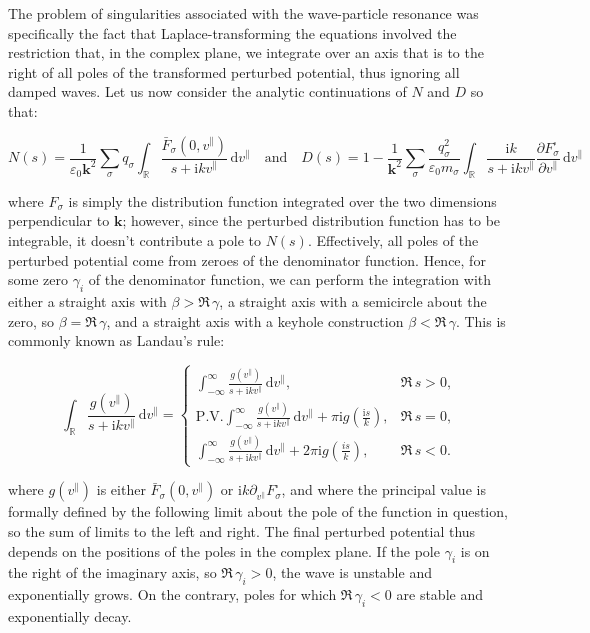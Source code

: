 \quad The problem of singularities associated with the wave-particle resonance was specifically the fact that Laplace-transforming the equations involved the restriction that, in the complex plane, we integrate over an axis that is to the right of all poles of the transformed perturbed potential, thus ignoring all damped waves. Let us now consider the analytic continuations of $N$ and $D$ so that:

\begin{equation}
    N(s)=\frac{1}{\varepsilon_0\mathbf{k}^2}\sum_\sigma q_\sigma\int_{\mathbb{R}}\frac{\bar{F}_\sigma(0,v^\parallel)}{s+\mathrm{i}kv^\parallel}\,\mathrm{d}v^\parallel\quad\text{and}\quad D(s)=1-\frac{1}{\mathbf{k}^2}\sum_\sigma\frac{q_\sigma^2}{\varepsilon_0m_\sigma}\int_{\mathbb{R}}\frac{\mathrm{i}k}{s+\mathrm{i}kv^\parallel}\frac{\partial F_\sigma^\square}{\partial v^\parallel}\,\mathrm{d}v^\parallel
\end{equation}

where $F_\sigma$ is simply the distribution function integrated over the two dimensions perpendicular to $\mathbf{k}$; however, since the perturbed distribution function has to be integrable, it doesn't contribute a pole to $N(s)$. Effectively, all poles of the perturbed potential come from zeroes of the denominator function. Hence, for some zero $\gamma_i$ of the denominator function, we can perform the integration with either a straight axis with $\beta>\Re\,\gamma$, a straight axis with a semicircle about the zero, so $\beta=\Re\,\gamma$, and a straight axis with a keyhole construction $\beta<\Re\,\gamma$. This is commonly known as Landau's rule:

\begin{equation}
    \int_\mathbb{R}\frac{g(v^\parallel)}{s+\mathrm{i}kv^\parallel}\,\mathrm{d}v^\parallel=\begin{cases}\int_{-\infty}^\infty\frac{g(v^\parallel)}{s+\mathrm{i}kv^\parallel}\,\mathrm{d}v^\parallel,& \Re\,s>0,\\\text{P.V.}\int_{-\infty}^\infty\frac{g(v^\parallel)}{s+\mathrm{i}kv^\parallel}\,\mathrm{d}v^\parallel+\pi\mathrm{i}g\left(\frac{\mathrm{i}s}{k}\right),& \Re\,s=0,\\\int_{-\infty}^\infty\frac{g(v^\parallel)}{s+\mathrm{i}kv^\parallel}\,\mathrm{d}v^\parallel+2\pi\mathrm{i}g\left(\frac{is}{k}\right),& \Re\,s<0.\end{cases}
\end{equation}

where $g(v^\parallel)$ is either $\bar{F}_\sigma(0,v^\parallel)$ or $\mathrm{i}k\partial_{v^\parallel}F_\sigma^\square$, and where the principal value is formally defined by the following limit about the pole of the function in question, so the sum of limits to the left and right. The final perturbed potential thus depends on the positions of the poles in the complex plane. If the pole $\gamma_i$ is on the right of the imaginary axis, so $\Re\,\gamma_i>0$, the wave is unstable and exponentially grows. On the contrary, poles for which $\Re\,\gamma_i<0$ are stable and exponentially decay.

